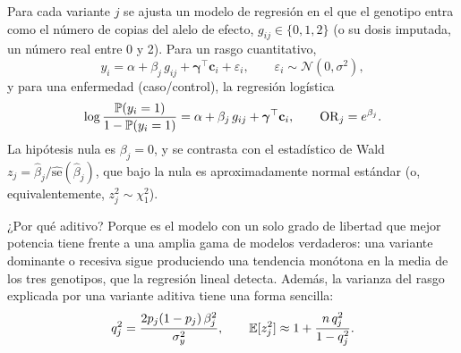 Para cada variante $j$ se ajusta un modelo de regresión en el que el genotipo entra como el número de copias del alelo de efecto, $g_{ij}\in\{0,1,2\}$ (o su dosis imputada, un número real entre 0 y 2). Para un rasgo cuantitativo,
\begin{equation}\label{eq:10-lineal}
y_i = \alpha + \beta_j\, g_{ij} + \boldsymbol\gamma^{\top}\mathbf{c}_i + \varepsilon_i,\qquad \varepsilon_i\sim\mathcal N(0,\sigma^2),
\end{equation}
y para una enfermedad (caso/control), la regresión logística
\begin{equation}\label{eq:10-logistica}
\log\frac{\mathbb{P}(y_i=1)}{1-\mathbb{P}(y_i=1)} = \alpha + \beta_j\, g_{ij} + \boldsymbol\gamma^{\top}\mathbf{c}_i ,\qquad \mathrm{OR}_j=e^{\beta_j}.
\end{equation}
La hipótesis nula es $\beta_j=0$, y se contrasta con el estadístico de Wald $z_j=\hat\beta_j/\widehat{\mathrm{se}}(\hat\beta_j)$, que bajo la nula es aproximadamente normal estándar (o, equivalentemente, $z_j^2\sim\chi^2_1$).

\begin{simbolos}
\end{simbolos}

¿Por qué aditivo? Porque es el modelo con un solo grado de libertad que mejor potencia tiene frente a una amplia gama de modelos verdaderos: una variante dominante o recesiva sigue produciendo una tendencia monótona en la media de los tres genotipos, que la regresión lineal detecta. Además, la varianza del rasgo explicada por una variante aditiva tiene una forma sencilla:
\begin{equation}\label{eq:10-q2}
q^2_j = \frac{2p_j(1-p_j)\,\beta_j^2}{\sigma_y^2}, \qquad \mathbb{E}[z_j^2]\approx 1 + \frac{n\,q_j^2}{1-q_j^2}.
\end{equation}

\begin{simbolos}
\end{simbolos}

